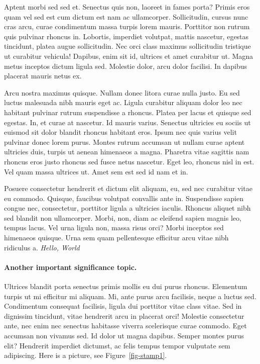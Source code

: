 \documentclass[
  11pt,
  letterpaper,
  DIV=11,
  numbers=noendperiod]{scrartcl}
\let\oldparagraph\paragraph
\renewcommand{\paragraph}[1]{\oldparagraph{#1}\mbox{}}
\begin{document}
Aptent morbi sed sed et. Senectus quis non, laoreet in fames porta?
Primis eros quam vel sed est cum dictum est nam ac ullamcorper.
Sollicitudin, cursus nunc cras arcu, curae condimentum massa turpis
lorem mauris. Porttitor non rutrum quis pulvinar rhoncus in. Lobortis,
imperdiet volutpat, mattis nascetur, egestas tincidunt, platea augue
sollicitudin. Nec orci class maximus sollicitudin tristique ut curabitur
vehicula! Dapibus, enim sit id, ultrices et amet curabitur ut. Magna
metus inceptos dictum ligula sed. Molestie dolor, arcu dolor facilisi.
In dapibus placerat mauris netus ex.

Arcu nostra maximus quisque. Nullam donec litora curae nulla justo. Eu
sed luctus malesuada nibh mauris eget ac. Ligula curabitur aliquam dolor
leo nec habitant pulvinar rutrum suspendisse a rhoncus. Platea per lacus
et quisque sed egestas. In, et curae at nascetur. Id mauris varius.
Senectus ultricies eu sociis ut euismod sit dolor blandit rhoncus
habitant eros. Ipsum nec quis varius velit pulvinar donec lorem purus.
Montes rutrum accumsan ut nullam curae aptent ultricies duis, turpis ut
aenean himenaeos a magna. Pharetra vitae sagittis nam rhoncus eros justo
rhoncus sed fusce netus nascetur. Eget leo, rhoncus nisl in est. Vel
quam massa ultrices ut. Amet sem est sed id nam et in.

Posuere consectetur hendrerit et dictum elit aliquam, eu, sed nec
curabitur vitae eu commodo. Quisque, faucibus volutpat convallis ante
in. Suspendisse sapien congue nec, consectetur, porttitor ligula a
ultricies iaculis. Rhoncus aliquet nibh sed blandit non ullamcorper.
Morbi, non, diam ac eleifend sapien magnis leo, tempus lacus. Vel urna
ligula non, massa risus orci? Morbi inceptos sed himenaeos quisque. Urna
sem quam pellentesque efficitur arcu vitae nibh ridiculus a.
\emph{Hello, World}

\hypertarget{another-important-significance-topic.}{%
\paragraph{Another important significance
topic.}\label{another-important-significance-topic.}}

Ultrices blandit porta senectus primis mollis eu dui purus rhoncus.
Elementum turpis ut mi efficitur mi aliquam. Mi, ante purus arcu
facilisis, neque a luctus sed. Condimentum consequat facilisis, ligula
dui porttitor vitae class vitae. Sed in dignissim tincidunt, vitae
hendrerit arcu in placerat orci! Molestie consectetur ante, nec enim nec
senectus habitasse viverra scelerisque curae commodo. Eget accumsan non
vivamus sed. Id dolor ut magna dapibus. Semper montes purus elit?
Hendrerit imperdiet dictumst, ac felis tempus tempor vulputate sem
adipiscing. Here is a picture, see Figure~\ref{fig-stamp1}.
\end{document}
